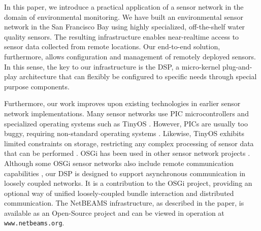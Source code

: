 \documentclass[conference]{IEEEtran}
\begin{document}

In this paper, we introduce a practical application of a sensor network
in the domain of environmental monitoring. We have built an
environmental sensor network in the San Francisco Bay using highly
specialized, off-the-shelf water quality sensors. The resulting
infrastructure enables near-realtime access to sensor data collected
from remote locations. Our end-to-end solution, furthermore, allows
configuration and management of remotely deployed sensors. In this sense, the
key to our infrastructure is the DSP, a micro-kernel plug-and-play
architecture that can flexibly be configured to specific needs through
special purpose components. 


Furthermore, our work improves upon existing technologies in earlier sensor network implementations.
Many sensor networks use PIC microcontrollers \cite{Pic01} and specialized operating systems
such as TinyOS \cite{tinyos01}. However, PICs are usually too buggy,
requiring non-standard operating systems \cite{Martinez04}. Likewise, TinyOS exhibits limited 
constraints on storage, restricting any complex processing of sensor data
that can be performed \cite{Martinez04}. OSGi has been used in other sensor network
projects \cite{Mueller07, Baude07}. Although some OSGi sensor networks also include remote 
communication capabilities \cite{Rellermeyer}, our DSP is designed to support asynchronous 
communication in loosely coupled networks. It is a contribution to the OSGi
project, providing an optional way of unified loosely-coupled bundle
interaction and distributed communication. The NetBEAMS infrastructure, as
described in the paper, is available as an Open-Source project and can be 
viewed in operation at \texttt{www.netbeams.org}.





\end{document}
